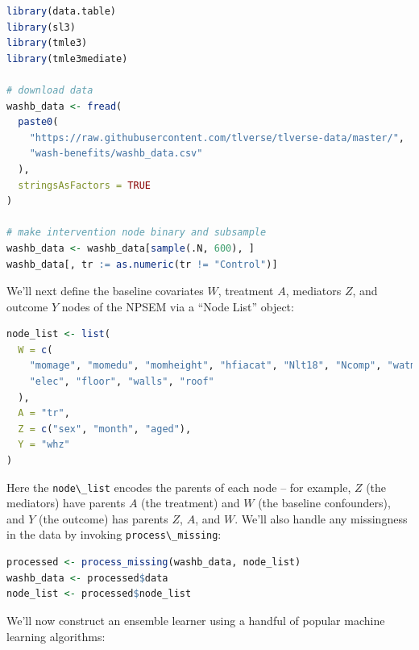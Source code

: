 \documentclass[12pt, krantz2,]{krantz}
\newcommand{\passthrough}[1]{#1}
\theoremstyle{definition}
\theoremstyle{definition}
\theoremstyle{definition}
\newcommand{\1}{\mathbbm{1}}
\begin{document}
\begin{lstlisting}[language=R]
library(data.table)
library(sl3)
library(tmle3)
library(tmle3mediate)

# download data
washb_data <- fread(
  paste0(
    "https://raw.githubusercontent.com/tlverse/tlverse-data/master/",
    "wash-benefits/washb_data.csv"
  ),
  stringsAsFactors = TRUE
)

# make intervention node binary and subsample
washb_data <- washb_data[sample(.N, 600), ]
washb_data[, tr := as.numeric(tr != "Control")]
\end{lstlisting}

We'll next define the baseline covariates \(W\), treatment \(A\), mediators \(Z\),
and outcome \(Y\) nodes of the NPSEM via a ``Node List'' object:

\begin{lstlisting}[language=R]
node_list <- list(
  W = c(
    "momage", "momedu", "momheight", "hfiacat", "Nlt18", "Ncomp", "watmin",
    "elec", "floor", "walls", "roof"
  ),
  A = "tr",
  Z = c("sex", "month", "aged"),
  Y = "whz"
)
\end{lstlisting}

Here the \passthrough{\lstinline!node\_list!} encodes the parents of each node -- for example, \(Z\) (the
mediators) have parents \(A\) (the treatment) and \(W\) (the baseline confounders),
and \(Y\) (the outcome) has parents \(Z\), \(A\), and \(W\). We'll also handle any
missingness in the data by invoking \passthrough{\lstinline!process\_missing!}:

\begin{lstlisting}[language=R]
processed <- process_missing(washb_data, node_list)
washb_data <- processed$data
node_list <- processed$node_list
\end{lstlisting}

We'll now construct an ensemble learner using a handful of popular machine
learning algorithms:
\end{document}
